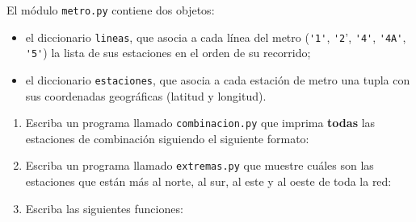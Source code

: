El módulo \texttt{metro.py} contiene dos objetos:
\begin{itemize}[leftmargin=0pt]
  \item el diccionario \verb!lineas!,
    que asocia a cada línea del metro
    (\verb!'1'!, \verb!'2!', \verb!'4'!, \verb!'4A'!, \verb!'5'!)
    la lista de sus estaciones
    en el orden de su recorrido;
  \item el diccionario \verb!estaciones!,
    que asocia a cada estación de metro
    una tupla con sus coordenadas geográficas
    (latitud y longitud).
\end{itemize}

\begin{enumerate}[leftmargin=0pt,label=\emph{\alph*})]
  \item
    Escriba un programa llamado \texttt{combinacion.py}
    que imprima \textbf{todas} las estaciones de combinación
    siguiendo el siguiente formato:
    

  \item
    Escriba un programa llamado \texttt{extremas.py}
    que muestre cuáles son las estaciones que están
    más al norte, al sur, al este y al oeste
    de toda la red:
    

  \newpage
  \item
    Escriba las siguientes funciones:
    
\end{enumerate}


